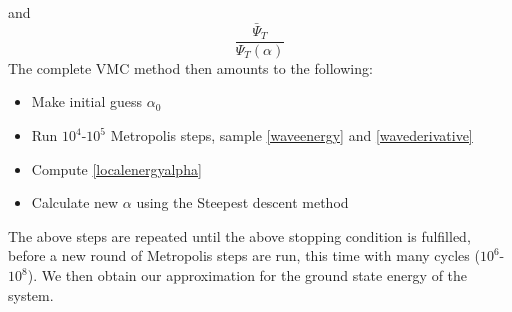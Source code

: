\documentclass[english, a4paper]{article}
\begin{document}
and 
\begin{equation}
 \frac{\bar{\Psi}_T}{\Psi_T(\alpha)}
 \label{wavederivative}
\end{equation}
The complete VMC method then amounts to the following:
\begin{itemize}
 \item Make initial guess $\alpha_0$
 \item Run $10^4$-$10^5$ Metropolis steps, sample \eqref{waveenergy} and \eqref{wavederivative}
 \item Compute \eqref{localenergyalpha} 
 \item Calculate new $\alpha$ using the Steepest descent method
\end{itemize}
The above steps are repeated until the above stopping condition is fulfilled, before a new round of
Metropolis steps are run, this time with many cycles ($10^6$-$10^8$). We then obtain our approximation
for the ground state energy of the system.\\
\end{document}
